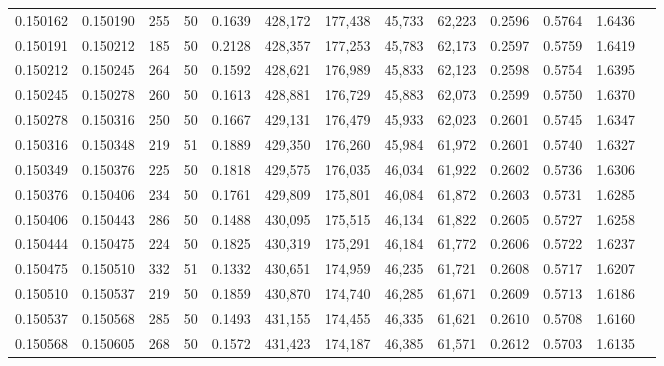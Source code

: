 \begin{tabular}{rrrrrrrrrrrrr}
0.150162 & 0.150190 &   255 &  50 &                                     0.1639 & 428,172 & 177,438 &  45,733 &  62,223 & 0.2596 & 0.5764 & 1.6436 \\
0.150191 & 0.150212 &   185 &  50 &                                     0.2128 & 428,357 & 177,253 &  45,783 &  62,173 & 0.2597 & 0.5759 & 1.6419 \\
0.150212 & 0.150245 &   264 &  50 &                                     0.1592 & 428,621 & 176,989 &  45,833 &  62,123 & 0.2598 & 0.5754 & 1.6395 \\
0.150245 & 0.150278 &   260 &  50 &                                     0.1613 & 428,881 & 176,729 &  45,883 &  62,073 & 0.2599 & 0.5750 & 1.6370 \\
0.150278 & 0.150316 &   250 &  50 &                                     0.1667 & 429,131 & 176,479 &  45,933 &  62,023 & 0.2601 & 0.5745 & 1.6347 \\
0.150316 & 0.150348 &   219 &  51 &                                     0.1889 & 429,350 & 176,260 &  45,984 &  61,972 & 0.2601 & 0.5740 & 1.6327 \\
0.150349 & 0.150376 &   225 &  50 &                                     0.1818 & 429,575 & 176,035 &  46,034 &  61,922 & 0.2602 & 0.5736 & 1.6306 \\
0.150376 & 0.150406 &   234 &  50 &                                     0.1761 & 429,809 & 175,801 &  46,084 &  61,872 & 0.2603 & 0.5731 & 1.6285 \\
0.150406 & 0.150443 &   286 &  50 &                                     0.1488 & 430,095 & 175,515 &  46,134 &  61,822 & 0.2605 & 0.5727 & 1.6258 \\
0.150444 & 0.150475 &   224 &  50 &                                     0.1825 & 430,319 & 175,291 &  46,184 &  61,772 & 0.2606 & 0.5722 & 1.6237 \\
0.150475 & 0.150510 &   332 &  51 &                                     0.1332 & 430,651 & 174,959 &  46,235 &  61,721 & 0.2608 & 0.5717 & 1.6207 \\
0.150510 & 0.150537 &   219 &  50 &                                     0.1859 & 430,870 & 174,740 &  46,285 &  61,671 & 0.2609 & 0.5713 & 1.6186 \\
0.150537 & 0.150568 &   285 &  50 &                                     0.1493 & 431,155 & 174,455 &  46,335 &  61,621 & 0.2610 & 0.5708 & 1.6160 \\
0.150568 & 0.150605 &   268 &  50 &                                     0.1572 & 431,423 & 174,187 &  46,385 &  61,571 & 0.2612 & 0.5703 & 1.6135 \\

\end{tabular}
